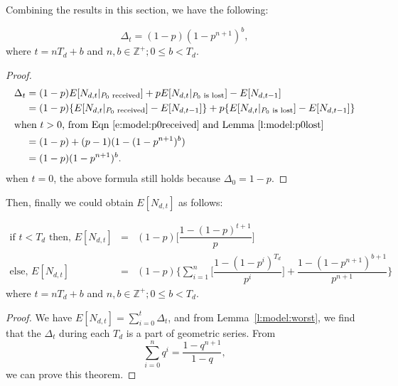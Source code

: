     Combining the results in this section, we have the following:
    \begin{lemma}
    \label{l:model:worst}
    \[
        \Delta_t = (1-p)(1-p^{n+1})^b,
    \]
where $t=nT_d+b$ and $n,b\in\mathbb{Z^+}; 0 \le b<T_d$.
    \end{lemma}
    \if{}
    \begin{proof}
    \begin{align*}
    \Delta_t &= (1-p)E[N_{d,t}|_\textrm{$P_0$ received}] + pE[N_{d,t}|_{\textrm{$P_0$ is lost}}]
    - E[N_{d,t-1}]\\
             &= (1-p)\{E[N_{d,t}|_\textrm{$P_0$ received}] - E[N_{d, t-1}]\} 
             + p\{E[N_{d,t}|_{\textrm{$P_0$ is lost}}] - E[N_{d, t-1}]\}\\
    \intertext{when $t>0$, from Eqn \ref{e:model:p0received} and Lemma~\ref{l:model:p0lost}}
             &= (1-p)+(p-1)(1-(1-p^{n+1})^b)\\
             &=(1-p)(1-p^{n+1})^b.
    \end{align*}
    when $t=0$, the above formula still holds because $\Delta_0 = 1-p$.
    \end{proof}
    \fi

    Then, finally we could obtain $E[N_{d,t}]$ as
    follows:
    \begin{theorem}
    \label{t:model:worst}
    \begin{eqnarray*}
       \textrm{if $t<T_d$ then, } E[N_{d,t}] &=& (1-p)\Big[\dfrac{1-(1-p)^{t+1}}{p}\Big]\\ 
       \textrm{else, } E[N_{d,t}] &=& (1-p)\Big\{\sum_{i=1}^n\Big[\dfrac{1-(1-p^i)^{T_d}}{p^i}\Big] +
       \dfrac{1-(1-p^{n+1})^{b+1}}{p^{n+1}}\Big\}
    \end{eqnarray*}
    where $t=nT_d+b$ and $n,b\in\mathbb{Z^+}; 0 \le b<T_d$.
    \end{theorem}
    \begin{proof}
    We have $E[N_{d,t}] = \sum_{i=0}^{t}\Delta_t$, and from Lemma~\ref{l:model:worst}, we
    find that the $\Delta_t$ during each $T_d$ is a part of geometric series. From
    \begin{displaymath}
        \sum_{i=0}^nq^i = \dfrac{1-q^{n+1}}{1-q}, 
    \end{displaymath}
    we can prove this theorem.

    \end{proof}

